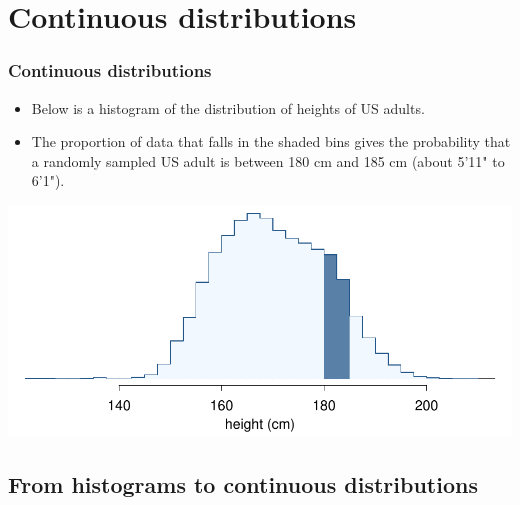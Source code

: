 
\section{Continuous distributions}


\begin{frame}
\frametitle{Continuous distributions}

\begin{itemize}

\item Below is a histogram of the distribution of heights of US adults. 

\item The proportion of data that falls in the shaded bins gives the probability that a randomly sampled US adult is between 180 cm and 185 cm (about 5'11" to 6'1").

\end{itemize}

\begin{center}
\includegraphics[width=\textwidth]{3-5_continuous_distributions/figures/usHeightsHist180185/usHeightsHist180185}
\end{center}


\end{frame}


\subsection{From histograms to continuous distributions}

